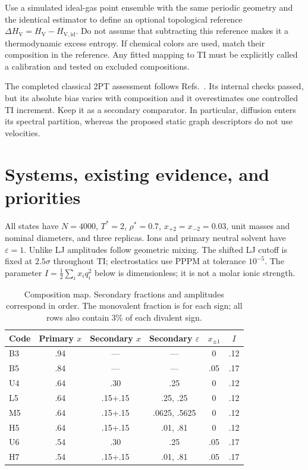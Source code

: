 \documentclass[11pt,a4paper]{article}
\newcommand{\Hv}{H_{\mathrm V}}
\begin{document}
Use a simulated ideal-gas point ensemble with the same periodic geometry and
the identical estimator to define an optional topological reference
$\Delta H_{\mathrm V}=\Hv-H_{\mathrm{V,id}}$. Do not assume that subtracting
this reference makes it a thermodynamic excess entropy. If chemical colors
are used, match their composition in the reference. Any fitted mapping to TI
must be explicitly called a calibration and tested on excluded compositions.

The completed classical 2PT assessment follows
Refs.~\cite{Sun2017,Lai2012}. Its internal checks passed, but its absolute
bias varies with composition and it overestimates one controlled TI increment.
Keep it as a secondary comparator. In particular, diffusion enters its spectral
partition, whereas the proposed static graph descriptors do not use velocities.

\section{Systems, existing evidence, and priorities}
All states have $N=4000$, $T^*=2$, $\rho^*=0.7$, $x_{+2}=x_{-2}=0.03$,
unit masses and nominal diameters, and three replicas. Ions and primary neutral
solvent have $\varepsilon=1$. Unlike LJ amplitudes follow geometric mixing.
The shifted LJ cutoff is fixed at $2.5\sigma$ throughout TI; electrostatics use
PPPM at tolerance $10^{-5}$. The parameter $I=\tfrac12\sum_i x_iq_i^2$ below
is dimensionless; it is not a molar ionic strength.

\begin{table}[ht]
\centering\small
\caption{Composition map. Secondary fractions and amplitudes correspond in order.
The monovalent fraction is for each sign; all rows also contain 3\% of each divalent sign.}
\begin{tabular}{@{}lccccc@{}}
\toprule
Code & Primary $x$ & Secondary $x$ & Secondary $\varepsilon$ & $x_{\pm1}$ & $I$\\
\midrule
B3 & .94 & --- & --- & 0 & .12\\
B5 & .84 & --- & --- & .05 & .17\\
U4 & .64 & .30 & .25 & 0 & .12\\
L5 & .64 & .15+.15 & .25, .25 & 0 & .12\\
M5 & .64 & .15+.15 & .0625, .5625 & 0 & .12\\
H5 & .64 & .15+.15 & .01, .81 & 0 & .12\\
U6 & .54 & .30 & .25 & .05 & .17\\
H7 & .54 & .15+.15 & .01, .81 & .05 & .17\\
\bottomrule
\end{tabular}
\end{table}
\end{document}
